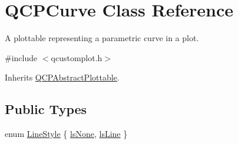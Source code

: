 \hypertarget{class_q_c_p_curve}{\section{Q\-C\-P\-Curve Class Reference}
\label{class_q_c_p_curve}
}


A plottable representing a parametric curve in a plot.  




{\ttfamily \#include $<$qcustomplot.\-h$>$}



Inherits \hyperlink{class_q_c_p_abstract_plottable}{Q\-C\-P\-Abstract\-Plottable}.

\subsection*{Public Types}
\begin{DoxyCompactItemize}
\item 
enum \hyperlink{class_q_c_p_curve_a2710e9f79302152cff794c6e16cc01f1}{Line\-Style} \{ \hyperlink{class_q_c_p_curve_a2710e9f79302152cff794c6e16cc01f1aec1601a191cdf0b4e761c4c66092cc48}{ls\-None}, 
\hyperlink{class_q_c_p_curve_a2710e9f79302152cff794c6e16cc01f1ade5822ce6fbf131d3df131795c2e1003}{ls\-Line}
 \}
\end{DoxyCompactItemize}
